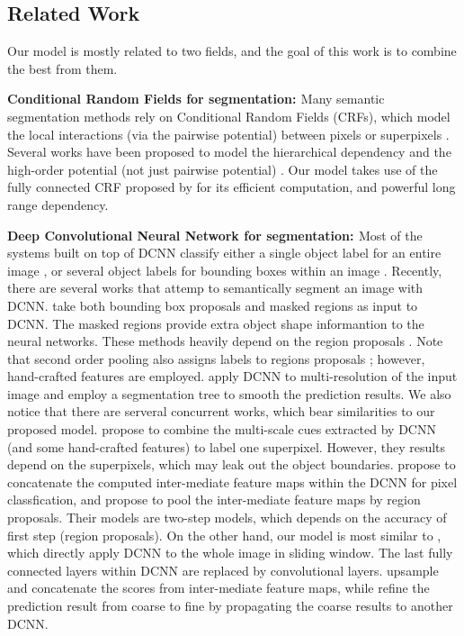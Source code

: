 \subsection{Related Work}
Our model is mostly related to two fields, and the goal of this work is to combine the best from them.

{\bf{Conditional Random Fields for segmentation: }} Many semantic segmentation methods rely on Conditional Random Fields (CRFs), which model the local interactions (via the pairwise potential) between pixels \citep{rother2004grabcut, shotton2009textonboost} or superpixels \citep{lucchi2011spatial}. Several works have been proposed to model the hierarchical dependency \citep{he2004multiscale, ladicky2009associative, lempitsky2011pylon} and the high-order potential (not just pairwise potential) \citep{delong2012fast, gonfaus2010harmony, kohli2009robust, krahenbuhl2011efficient}. Our model takes use of the fully connected CRF proposed by \citet{krahenbuhl2011efficient} for its efficient computation, and powerful long range dependency.

{\bf{Deep Convolutional Neural Network for segmentation: }} Most of the systems built on top of DCNN classify either a single object label for an entire image \citep{KrizhevskyNIPS2013, simonyan2014very, szegedy2014going}, or several object labels for bounding boxes within an image \citep{papandreou2014untangling, girshick2014rcnn}. Recently, there are several works that attemp to semantically segment an image with DCNN. \citet{girshick2014rcnn, hariharan2014simultaneous} take both bounding box proposals and masked regions as input to DCNN. The masked regions provide extra object shape informantion to the neural networks. These methods heavily depend on the region proposals \citep{arbelaez2014multiscale, Uijlings13}. Note that second order pooling \citep{carreira2012semantic} also assigns labels to regions proposals \citep{carreira2012cpmc}; however, hand-crafted features are employed. \citet{farabet2013learning} apply DCNN to multi-resolution of the input image and employ a segmentation tree to smooth the prediction results. We also notice that there are serveral concurrent works, which bear similarities to our proposed model. \citet{mostajabi2014feedforward} propose to combine the multi-scale cues extracted by DCNN (and some hand-crafted features) to label one superpixel. However, they results depend on the superpixels, which may leak out the object boundaries. \citet{hariharan2014hypercolumns} propose to concatenate the computed inter-mediate feature maps within the DCNN for pixel classfication, and \citet{dai2014convolutional} propose to pool the inter-mediate feature maps by region proposals. Their models are two-step models, which depends on the accuracy of first step (\ie region proposals). On the other hand, our model is most similar to \citet{long2014fully, eigen2014predicting}, which directly apply DCNN to the whole image in sliding window. The last fully connected layers within DCNN are replaced by convolutional layers. \citet{long2014fully} upsample and concatenate the scores from inter-mediate feature maps, while \citet{eigen2014predicting} refine the prediction result from coarse to fine by propagating the coarse results to another DCNN. 

